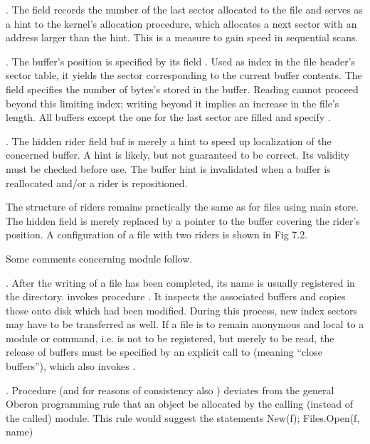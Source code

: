 \smallskip{}. The field  records the number of the last sector allocated to the file and serves as a hint to the kernel's allocation procedure, which allocates a next sector with an address larger than the hint. This is a measure to gain speed in sequential scans.

\smallskip{}. The buffer's position is specified by its field . Used as index in the file header's sector table, it yields the sector corresponding to the current buffer contents. The field  specifies the number of bytes's stored in the buffer. Reading cannot proceed beyond this limiting index; writing beyond it implies an increase in the file's length. All buffers except the one for the last sector are filled and specify .

\smallskip{}. The hidden rider field buf is merely a hint to speed up localization of the concerned buffer. A hint is likely, but not guaranteed to be correct. Its validity must be checked before use. The buffer hint is invalidated when a buffer is reallocated and/or a rider is repositioned.

The structure of riders remains practically the same as for files using main store. The hidden field  is merely replaced by a pointer to the buffer covering the rider's position. A configuration of a file  with two riders is shown in Fig 7.2.

Some comments concerning module  follow.

\smallskip{}. After the writing of a file has been completed, its name is usually registered in the directory.  invokes procedure . It inspects the associated buffers and copies those onto disk which had been modified. During this process, new index sectors may have to be transferred as well. If a file is to remain anonymous and local to a module or command, i.e. is not to be registered, but merely to be read, the release of buffers must be specified by an explicit call to  (meaning ``close buffers''), which also invokes .


\smallskip{}. Procedure  (and for reasons of consistency also ) deviates from the general Oberon programming rule that an object be allocated by the calling (instead of the called) module. This rule would suggest the statements
\begintt
New(f); Files.Open(f, name)
\endtt

